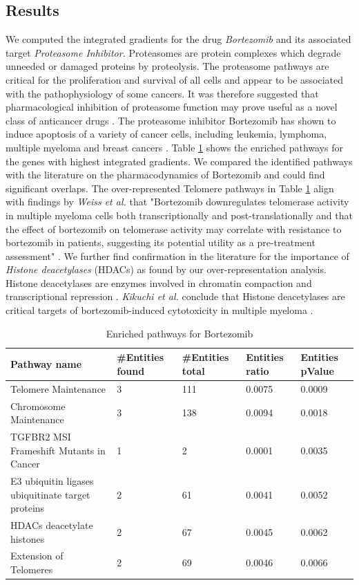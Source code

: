 \documentclass[bsc,frontabs,twoside,singlespacing,parskip,deptreport]{infthesis}     %
\let\Oldsubsection\subsection
\renewcommand{\subsection}{\FloatBarrier\Oldsubsection}
\begin{document}
\subsection{Results}
We computed the integrated gradients for the drug \textit{Bortezomib} and its associated target \textit{Proteasome Inhibitor.} Proteasomes are protein complexes which degrade unneeded or damaged proteins by proteolysis. The proteasome pathways are critical for the proliferation and survival of all cells and appear to be associated with the pathophysiology of some cancers. It was therefore suggested that pharmacological inhibition of proteasome function may prove useful as a novel class of anticancer drugs \cite{chen_bortezomib_2011}. The proteasome inhibitor Bortezomib has shown to induce apoptosis of a variety of cancer cells, including leukemia, lymphoma, multiple myeloma and breast cancers \cite{cao_ubiquitin-proteasomal_2011}.
Table \ref{bortezomib} shows the enriched pathways for the genes with highest integrated gradients. We compared the identified pathways with the literature on the pharmacodynamics of Bortezomib and could find significant overlaps. 
The over-represented Telomere pathways in Table \ref{bortezomib} align with findings by \textit{Weiss et al.} that "Bortezomib downregulates telomerase activity in multiple myeloma cells both transcriptionally and post-translationally and that the effect of bortezomib on telomerase activity may correlate with resistance to bortezomib in patients, suggesting its potential utility as a pre-treatment assessment" \cite{weiss_differential_2012}.
We further find confirmation in the literature for the importance of \textit{Histone deacetylases} (HDACs) as found by our over-representation analysis. Histone deacetylases are enzymes involved in chromatin compaction and transcriptional repression \cite{yang_rpd3hda1_2008}. \textit{Kikuchi et al.} conclude that Histone deacetylases are critical targets of bortezomib-induced cytotoxicity in multiple myeloma \cite{kikuchi_histone_2010}.

\begin{table}[h!]
\centering
\begin{tabular}{p{8cm}p{1.5cm}p{1.5cm}p{1.5cm}p{1.5cm}}
\toprule
Pathway name &	\#Entities found &	\#Entities total &	Entities ratio &	Entities pValue\\
\midrule
Telomere Maintenance&	3&	111&	0.0075	&0.0009 \\
Chromosome Maintenance&	3&	138 &	0.0094&	0.0018 \\
TGFBR2 MSI Frameshift Mutants in Cancer &	1 &	2&	0.0001&	0.0035 \\
E3 ubiquitin ligases ubiquitinate target proteins&	2&	61&	0.0041&	0.0052\\
HDACs deacetylate histones&	2&	67&	0.0045&	0.0062\\
Extension of Telomeres&	2&	69&	0.0046&	0.0066 \\
\bottomrule
\end{tabular}
\caption{Enriched pathways for Bortezomib}\label{bortezomib}
\end{table}
\end{document}

